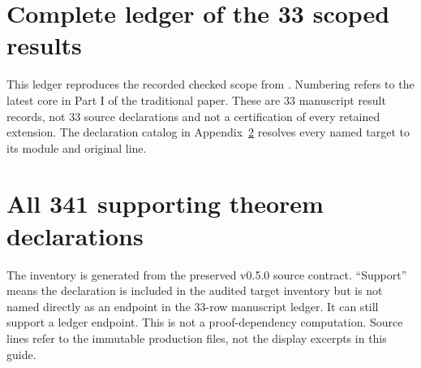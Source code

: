 

\usepackage{komorebi-publication}
\renewcommand{\KomorebiTitle}{Transfer Semigroups and Memory}
\renewcommand{\KomorebiSubtitle}{Probabilistic refinement, fractional operators, and exact hidden-state elimination}
\renewcommand{\KomorebiSeries}{Core series VI}
\renewcommand{\KomorebiKind}{Lean and evidence guide}
\renewcommand{\KomorebiEdition}{Standardized publication edition / 8 October 2026}
\renewcommand{\KomorebiShortTitle}{Paper VI}
\renewcommand{\KomorebiTitleSize}{38}
\renewcommand{\KomorebiTitleLeading}{43}
\renewcommand{\KomorebiProfile}{classical}
\renewcommand{\KomorebiOrientation}{portrait}
\KomorebiSetup

\KomorebiCover
{}


\tableofcontents
\clearpage











\clearpage\appendix
\section{Complete ledger of the 33 scoped results}
\label{sec:ledger}
This ledger reproduces the recorded checked scope from . Numbering refers to the latest core in Part I of the traditional paper. These are 33 manuscript result records, not 33 source declarations and not a certification of every retained extension. The declaration catalog in Appendix~\ref{sec:catalog} resolves every named target to its module and original line.

\clearpage
\section{All 341 supporting theorem declarations}
\label{sec:catalog}
The inventory is generated from the preserved v0.5.0 source contract. ``Support'' means the declaration is included in the audited target inventory but is not named directly as an endpoint in the 33-row manuscript ledger. It can still support a ledger endpoint. This is not a proof-dependency computation. Source lines refer to the immutable production files, not the display excerpts in this guide.

\clearpage
